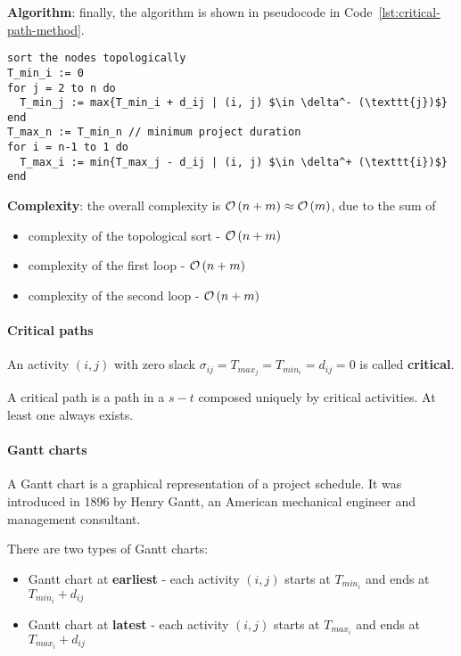 \documentclass[english]{article}
\begin{document}
\bigskip
\textbf{Algorithm}:
finally, the algorithm is shown in pseudocode in Code~\ref{lst:critical-path-method}.

\begin{lstlisting}[caption={Critical path method}, label={lst:critical-path-method}, float]
sort the nodes topologically
T_min_i := 0
for j = 2 to n do
  T_min_j := max{T_min_i + d_ij | (i, j) $\in \delta^- (\texttt{j})$}
end
T_max_n := T_min_n // minimum project duration
for i = n-1 to 1 do
  T_max_i := min{T_max_j - d_ij | (i, j) $\in \delta^+ (\texttt{i})$}
end
\end{lstlisting}

\bigskip
\textbf{Complexity}:
the overall complexity is \(\mathcal{O}\left(n+m\right) \approx \mathcal{O}\left(m\right)\), due to the sum of

\begin{itemize}
  \item complexity of the topological sort - \(\mathcal{O}\left(n+m\right)\)
  \item complexity of the first loop - \(\mathcal{O}\left(n+m\right)\)
  \item complexity of the second loop - \(\mathcal{O}\left(n+m\right)\)
\end{itemize}

\paragraph{Critical paths}

An activity \(\left( i, j \right)\) with zero slack \(\sigma_{ij} = T_{max_j} = T_{min_i} = d_{ij} = 0\) is called \textbf{critical}.

A critical path is a path in a \(s-t\) composed uniquely by critical activities.
At least one always exists.

\paragraph{Gantt charts}

A Gantt chart is a graphical representation of a project schedule.
It was introduced in 1896 by Henry Gantt, an American mechanical engineer and management consultant.

There are two types of Gantt charts:

\begin{itemize}
  \item Gantt chart at \textbf{earliest} - each activity \(\left( i, j \right)\) starts at \(T_{min_i}\) and ends at \(T_{min_i} + d_{ij}\)
  \item Gantt chart at \textbf{latest} - each activity \(\left( i, j \right)\) starts at \(T_{max_i}\) and ends at \(T_{max_i} + d_{ij}\)
\end{itemize}
\end{document}
